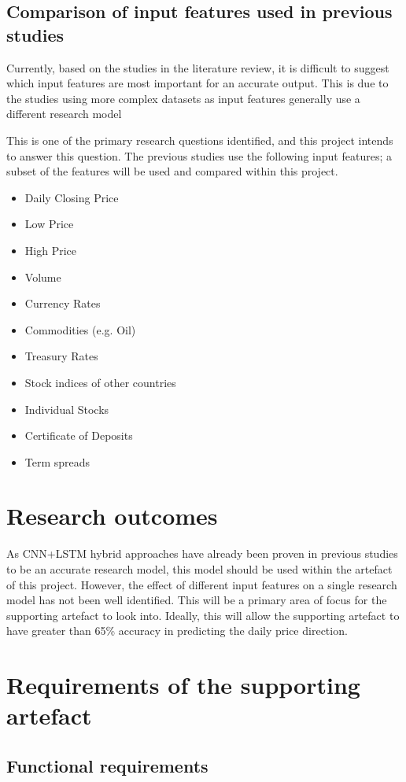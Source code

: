 \subsection{Comparison of input features used in previous studies}
Currently, based on the studies in the literature review, it is difficult to suggest which input features
are most important for an accurate output. This is due to the studies using more complex datasets as input
features generally use a different research model 

This is one of the primary research questions identified, and this project intends to answer this question.
The previous studies use the following input features; a subset of the features will be used and compared
within this project. 
\begin{itemize}
    \item Daily Closing Price
    \item Low Price
    \item High Price
    \item Volume
    \item Currency Rates
    \item Commodities (e.g. Oil)
    \item Treasury Rates
    \item Stock indices of other countries
    \item Individual Stocks
    \item Certificate of Deposits
    \item Term spreads
\end{itemize}

\section{Research outcomes}
As CNN+LSTM hybrid approaches have already been proven in previous studies to be an accurate research model,
this model should be used within the artefact of this project. However, the effect of different input
features on a single research model has not been well identified. This will be a primary area of focus for
the supporting artefact to look into. Ideally, this will allow the supporting artefact to have greater than
65\% accuracy in predicting the daily price direction.

\section{Requirements of the supporting artefact}
\subsection{Functional requirements}
